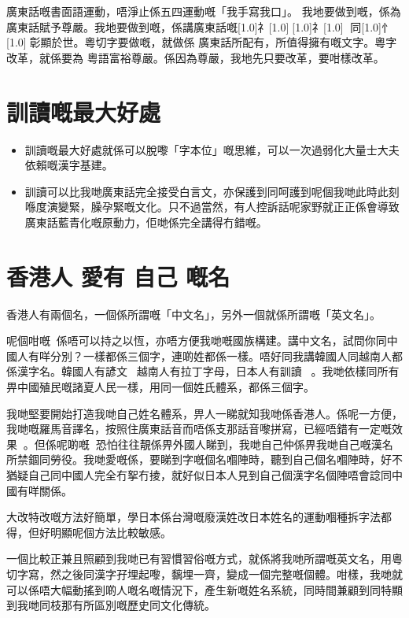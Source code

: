 \documentclass[a5paper, 10pt, openany]{book} %
\begin{document}
廣東話嘅書面語運動，唔淨止係五四運動嘅「我手寫我口」。 我地要做到嘅，係為廣東話賦予尊嚴。我地要做到嘅，係講廣東話嘅\scalebox{0.5}[1.0]{礻}\scalebox{0.5}[1.0]{}\scalebox{0.5}[1.0]{礻}\scalebox{0.5}[1.0]{} 同\scalebox{0.5}[1.0]{忄}\scalebox{0.5}[1.0]{}彰顯於世。粵切字要做嘅，就做係 廣東話所配有，所值得擁有嘅文字。粵字改革，就係要為 粵語富裕尊嚴。係因為尊嚴，我地先只要改革，要咁樣改革。

\chapter{訓讀嘅最大好處}
\begin{itemize}
  \item 訓讀嘅最大好處就係可以脫嚟「字本位」嘅思維，可以一次過弱化大量士大夫依賴嘅漢字基建。
  \item 訓讀可以比我哋廣東話完全接受白言文，亦保護到同呵護到呢個我哋此時此刻喺度演變緊，臊孕緊嘅文化。只不過當然，有人控訴話呢家野就正正係會導致廣東話藍青化嘅原動力，佢哋係完全講得冇錯嘅。
\end{itemize}


\chapter{香港人 愛有 自己 嘅名}
香港人有兩個名，一個係所謂嘅「中文名」，另外一個就係所謂嘅「英文名」。

呢個咁嘅係唔可以持之以恆，亦唔方便我哋嘅國族構建。講中文名，試問你同中國人有咩分別？一樣都係三個字，連啲姓都係一樣。唔好同我講韓國人同越南人都係漢字名。韓國人有諺文󱼙，越南人有拉丁字母，日本人有訓讀。我哋依樣同所有畀中國殖民嘅諸夏人民一樣，用同一個姓氏體系，都係三個字。

我哋堅要開始打造我哋自己姓名體系，畀人一睇就知我哋係香港人。係呢一方便，我哋嘅羅馬音譯名，按照住廣東話音而唔係支那話音嚟拼寫，已經唔錯有一定嘅效果。但係呢啲嘅恐怕往往靚係畀外國人睇到，我哋自己仲係畀我哋自己嘅漢名所禁錮同勞役。我哋愛嘅係，要睇到字嘅個名嗰陣時，聽到自己個名嗰陣時，好不猶疑自己同中國人完全冇挐冇掕，就好似日本人見到自己個漢字名個陣唔會諗同中國有咩關係。

大改特改嘅方法好簡單，學日本係台灣嘅廢漢姓改日本姓名的運動嗰種拆字法都得，但好明顯呢個方法比較敏感。

一個比較正兼且照顧到我哋已有習慣習俗嘅方式，就係將我哋所謂嘅英文名，用粵切字寫，然之後同漢字孖埋起嚟，黐埋一齊，變成一個完整嘅個體。咁樣，我哋就可以係唔大幅動搖到啲人嘅名嘅情況下，產生新嘅姓名系統，同時間兼顧到同特顯到我哋同枝那有所區別嘅歷史同文化傳統。
\end{document}
